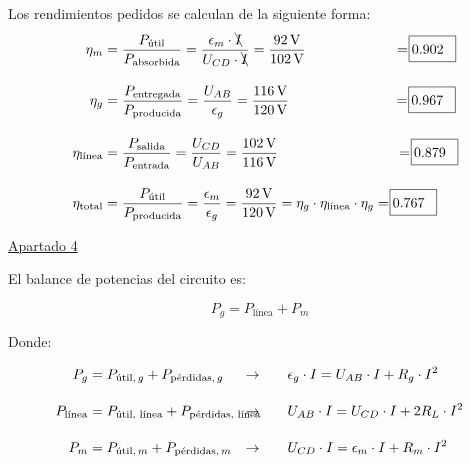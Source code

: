 \documentclass[10pt]{article}
\begin{document}
\vspace{5mm}

Los rendimientos pedidos se calculan de la siguiente forma:
\begin{align*}
    \eta_m &= \frac{P_{\textrm{útil}}}{P_{\textrm{absorbida}}} = \frac{\epsilon_m \cdot \bcancel{I}}{U_{CD} \cdot \bcancel{I}} = \frac{\qty{92}{\volt}}{\qty{102}{\volt}} \hspace{22mm} = \rlap{\kern-0.5ex\fbox{\rule[-2.5pt]{0pt}{12pt}\rule{27pt}{0pt}}} 0.902\\[10pt]
    \eta_g &= \frac{P_{\textrm{entregada}}}{P_{\textrm{producida}}} = \frac{U_{AB}}{\epsilon_g} = \frac{\qty{116}{\volt}}{\qty{120}{\volt}} \hspace{26.1mm}= \rlap{\kern-0.5ex\fbox{\rule[-2.5pt]{0pt}{12pt}\rule{27pt}{0pt}}} 0.967\\[10pt]
    \eta_{\textrm{línea}} &= \frac{P_{\textrm{salida}}}{P_{\textrm{entrada}}} = \frac{U_{CD}}{U_{AB}} = \frac{\qty{102}{\volt}}{\qty{116}{\volt}} \hspace{29.5mm} = \rlap{\kern-0.5ex\fbox{\rule[-2.5pt]{0pt}{12pt}\rule{27pt}{0pt}}} 0.879\\[10pt]
    \eta_{\textrm{total}} &= \frac{P_{\textrm{útil}}}{P_{\textrm{producida}}} = \frac{\epsilon_m}{\epsilon_g} = \frac{\qty{92}{\volt}}{\qty{120}{\volt}} = \eta_g \cdot \eta_{\textrm{línea}} \cdot \eta_g = \rlap{\kern-0.5ex\fbox{\rule[-2.5pt]{0pt}{12pt}\rule{27pt}{0pt}}} 0.767
\end{align*}

\vspace{6mm}

\underline{Apartado 4}

\vspace{5mm}

El balance de potencias del circuito es:

\[
  P_{g} = P_{\textrm{línea}} + P_{m} 
\]

Donde:

\begin{align*}
    P_{g} &= P_{\textrm{útil}, \, g} + P_{\textrm{pérdidas}, \, g} &\rightarrow  \qquad &\epsilon_g \cdot I = U_{AB} \cdot I + R_g \cdot I^2 \\[10pt]
    P_{\textrm{línea}} &= P_{\textrm{útil, línea}} + P_{\textrm{pérdidas, línea}} \hspace{-20mm} &\rightarrow \qquad &U_{AB} \cdot I = U_{CD} \cdot I + 2 R_L \cdot I^2\\[10pt]
    P_{m} &= P_{\textrm{útil}, \, m} + P_{\textrm{pérdidas}, \, m} &\rightarrow  \qquad &U_{CD} \cdot I = \epsilon_m \cdot I + R_m \cdot I^2 
\end{align*}
\end{document}
